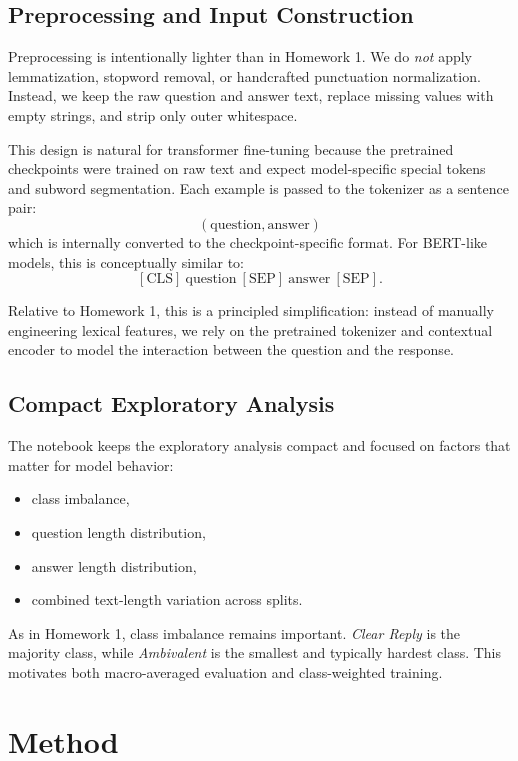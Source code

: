 \documentclass[12pt]{fphw}
\begin{document}
\subsection{Preprocessing and Input Construction}

Preprocessing is intentionally lighter than in Homework 1. We do \emph{not} apply lemmatization, stopword removal, or handcrafted punctuation normalization. Instead, we keep the raw question and answer text, replace missing values with empty strings, and strip only outer whitespace.

This design is natural for transformer fine-tuning because the pretrained checkpoints were trained on raw text and expect model-specific special tokens and subword segmentation. Each example is passed to the tokenizer as a sentence pair:
\[
(\text{question}, \text{answer})
\]
which is internally converted to the checkpoint-specific format. For BERT-like models, this is conceptually similar to:
\[
[\text{CLS}]~\text{question}~[\text{SEP}]~\text{answer}~[\text{SEP}].
\]

Relative to Homework 1, this is a principled simplification: instead of manually engineering lexical features, we rely on the pretrained tokenizer and contextual encoder to model the interaction between the question and the response.

\subsection{Compact Exploratory Analysis}

The notebook keeps the exploratory analysis compact and focused on factors that matter for model behavior:
\begin{itemize}
	\item class imbalance,
	\item question length distribution,
	\item answer length distribution,
	\item combined text-length variation across splits.
\end{itemize}

As in Homework 1, class imbalance remains important. \emph{Clear Reply} is the majority class, while \emph{Ambivalent} is the smallest and typically hardest class. This motivates both macro-averaged evaluation and class-weighted training.

\section{Method}
\end{document}
